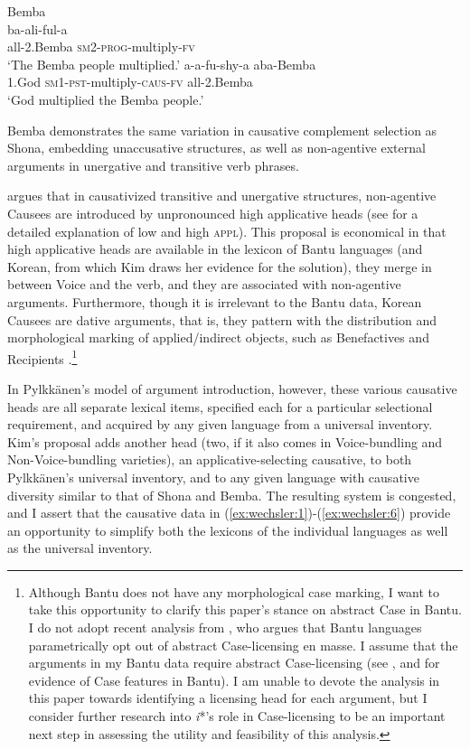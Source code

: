 \documentclass[output=paper,modfonts,nonflat]{langsci/langscibook}
\begin{document}
\ea\label{ex:wechsler:6}
Bemba \citep[155]{Givón1969}\\
\ea 
{}  {{ba-ali-ful-a}}  \\
 {all-2.Bemba}   {\textsc{sm2}{}-\textsc{prog}{}-multiply-\textsc{fv}}  \\
\glt `The Bemba people multiplied.'
\ex
{}  {{a-a-fu-shy-a} }  {{aba-Bemba}}\\
 1.God  {\textsc{sm1-pst}{}-multiply-\textsc{caus}{}-\textsc{fv}}  {all-2.Bemba}\\
\glt `God multiplied the Bemba people.'
\z
\z

Bemba demonstrates the same variation in causative complement selection as Shona, embedding unaccusative structures, as well as non-agentive external arguments in unergative and transitive verb phrases. 


\citet{Kim2011} argues that in causativized transitive and unergative structures, non-agentive Causees are introduced by unpronounced high applicative heads (see  for a detailed explanation of low and high \textsc{appl).} This proposal is economical in that high applicative heads are available in the lexicon of Bantu languages (and Korean, from which Kim draws her evidence for the solution), they merge in between Voice and the verb, and they are associated with non-agentive arguments. Furthermore, though it is irrelevant to the Bantu data, Korean Causees are dative arguments, that is, they pattern with the distribution and morphological marking of applied/indirect objects, such as Benefactives and Recipients \citep{Kim2011}.\footnote{{Although Bantu does not have any morphological case marking, I want to take this opportunity to clarify this paper's stance on abstract Case in Bantu. I do not adopt recent analysis from} {\citet{Diercks2012}, who argues that Bantu languages parametrically opt out of abstract Case-licensing en masse. I assume that the arguments in my Bantu data require abstract Case-licensing (see} \citealt{vanderWal2015,SheehanvanderWal2016,Halpert2012}, and \citealt{Wechsler2014,Wechsler2016} for evidence of Case features in Bantu). I am unable to devote the analysis in this paper towards identifying a licensing head for each argument, but I consider further research into \textit{i}*’s role in Case-licensing to be an important next step in assessing the utility and feasibility of this analysis.}


In Pylkkänen’s model of argument introduction, however, these various causative heads are all separate lexical items, specified each for a particular selectional requirement, and acquired by any given language from a universal inventory. Kim’s proposal adds another head (two, if it also comes in Voice-bundling and Non-Voice-bundling varieties), an applicative-selecting causative, to both Pylkkänen’s universal inventory, and to any given language with causative diversity similar to that of Shona and Bemba. The resulting system is congested, and I assert that the causative data in (\ref{ex:wechsler:1})-(\ref{ex:wechsler:6}) provide an opportunity to simplify both the lexicons of the individual languages as well as the universal inventory.
\end{document}
